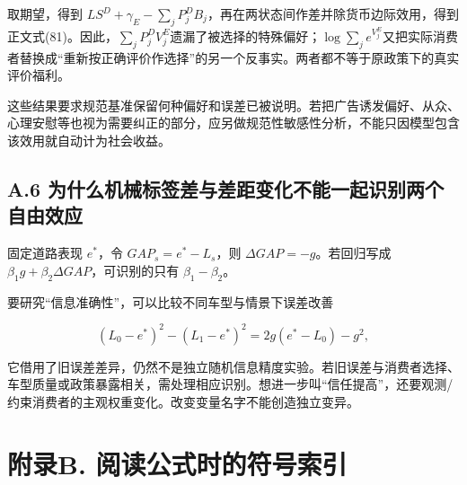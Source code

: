 \documentclass[
  11pt,
]{article}
\begin{document}
取期望，得到
\(LS^D+\gamma_E-\sum_jP_j^DB_j\)，再在两状态间作差并除货币边际效用，得到正文式(81)。因此，\(\sum_jP_j^D V_j^E\)遗漏了被选择的特殊偏好；\(\log\sum_j e^{V_j^E}\)又把实际消费者替换成``重新按正确评价作选择''的另一个反事实。两者都不等于原政策下的真实评价福利。

这些结果要求规范基准保留何种偏好和误差已被说明。若把广告诱发偏好、从众、心理安慰等也视为需要纠正的部分，应另做规范性敏感性分析，不能只因模型包含该效用就自动计为社会收益。

\subsection{A.6
为什么机械标签差与差距变化不能一起识别两个自由效应}\label{a.6-ux4e3aux4ec0ux4e48ux673aux68b0ux6807ux7b7eux5deeux4e0eux5deeux8dddux53d8ux5316ux4e0dux80fdux4e00ux8d77ux8bc6ux522bux4e24ux4e2aux81eaux7531ux6548ux5e94}

固定道路表现 \(e^*\)，令 \(GAP_s=e^*-L_s\)，则
\(\Delta GAP=-g\)。若回归写成
\(\beta_1g+\beta_2\Delta GAP\)，可识别的只有 \(\beta_1-\beta_2\)。

要研究``信息准确性''，可以比较不同车型与情景下误差改善

\[
(L_0-e^*)^2-(L_1-e^*)^2
=2g(e^*-L_0)-g^2,
\tag{A10}
\]

它借用了旧误差差异，仍然不是独立随机信息精度实验。若旧误差与消费者选择、车型质量或政策暴露相关，需处理相应识别。想进一步叫``信任提高''，还要观测/约束消费者的主观权重变化。改变变量名字不能创造独立变异。

\section{附录B.
阅读公式时的符号索引}\label{ux9644ux5f55b.-ux9605ux8bfbux516cux5f0fux65f6ux7684ux7b26ux53f7ux7d22ux5f15}
\end{document}
